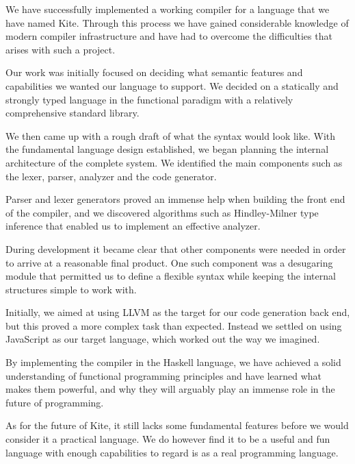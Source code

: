 
We have successfully implemented a working compiler for a language that we have named Kite. Through this process we have gained considerable knowledge of modern compiler infrastructure and have had to overcome the difficulties that arises with such a project.

Our work was initially focused on deciding what semantic features and capabilities we wanted our language to support. We decided on a statically and strongly typed language in the functional paradigm with a relatively comprehensive standard library.

We then came up with a rough draft of what the syntax would look like. With the fundamental language design established, we began planning the internal architecture of the complete system. We identified the main components such as the lexer, parser, analyzer and the code generator.

Parser and lexer generators proved an immense help when building the front end of the compiler, and we discovered algorithms such as Hindley-Milner type inference that enabled us to implement an effective analyzer.

During development it became clear that other components were needed in order to arrive at a reasonable final product. One such component was a desugaring module that permitted us to define a flexible syntax while keeping the internal structures simple to work with.

Initially, we aimed at using LLVM as the target for our code generation back end, but this proved a more complex task than expected. Instead we settled on using JavaScript as our target language, which worked out the way we imagined.

By implementing the compiler in the Haskell language, we have achieved a solid understanding of functional programming principles and have learned what makes them powerful, and why they will arguably play an immense role in the future of programming.

As for the future of Kite, it still lacks some fundamental features before we would consider it a practical language. We do however find it to be a useful and fun language with enough capabilities to regard is as a real programming language.